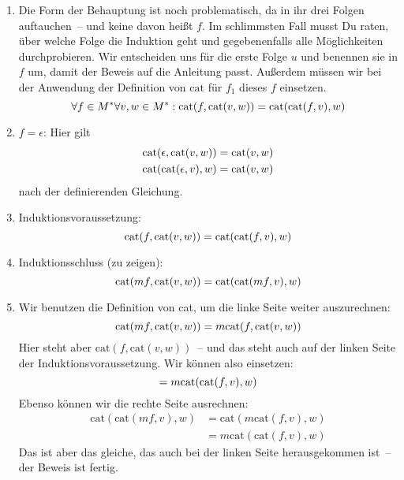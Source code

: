 \begin{enumerate}
\item Die Form der Behauptung ist noch problematisch, da in ihr drei Folgen
  auftauchen~-- und keine davon heißt $f$.  Im schlimmsten Fall musst
  Du raten, über welche Folge die Induktion geht und gegebenenfalls
  alle Möglichkeiten durchprobieren.  Wir entscheiden uns für die
  erste Folge $u$ und benennen sie in $f$ um, damit der Beweis auf die
  Anleitung passt.  Außerdem müssen wir bei der Anwendung der
  Definition von $\textrm{cat}$ für $f_1$ dieses $f$ einsetzen.
  \begin{displaymath}
    \forall f\in M^\ast \forall v,w\in M^\ast: {\rm cat}(f,{\rm cat}(v,w))  =  {\rm cat}({\rm cat}(f,v),w)
  \end{displaymath}
\item
  $f=\epsilon$: Hier gilt
  \begin{displaymath}
    \begin{split}
    {\rm cat}(\epsilon, {\rm cat}(v, w)) & = {\rm cat}(v,w)\\
    {\rm cat}({\rm cat}(\epsilon, v), w) & = {\rm cat}(v,w)
  \end{split}
\end{displaymath}
  nach der definierenden Gleichung.
\item Induktionsvoraussetzung:
%
\begin{displaymath}
  {\rm cat}(f,{\rm cat}(v,w))  = {\rm cat}({\rm cat}(f,v),w)
\end{displaymath}
%
\item Induktionsschluss (zu zeigen): 
%
\begin{displaymath}
  {\rm cat}(mf,{\rm cat}(v,w))  = {\rm cat}({\rm cat}(mf,v),w)
\end{displaymath}
%
\item Wir benutzen die Definition von cat, um die linke Seite weiter
  auszurechnen:
  \begin{displaymath}
    {\rm cat}(mf,{\rm cat}(v,w)) = m \mathrm{cat}(f,\mathrm{cat}(v, w))
  \end{displaymath}
  Hier steht aber $\mathrm{cat}(f,\mathrm{cat}(v, w))$~-- und das
  steht auch auf der linken Seite der Induktionsvoraussetzung.  Wir
  können also einsetzen:
  \begin{displaymath}
    = m {\rm cat}({\rm cat}(f,v),w)
  \end{displaymath}
  Ebenso können wir die rechte Seite ausrechnen:
  \begin{displaymath}
    \begin{split}
    \mathrm{cat}(\mathrm{cat}(mf,v),w) &=
    \mathrm{cat}(m\mathrm{cat}(f,v), w)\\ &=
    m\mathrm{cat}(\mathrm{cat}(f,v), w)
  \end{split}
\end{displaymath}  %
  Das ist aber das gleiche, das auch bei der linken Seite
  herausgekommen ist~-- der Beweis ist fertig.
\end{enumerate}


